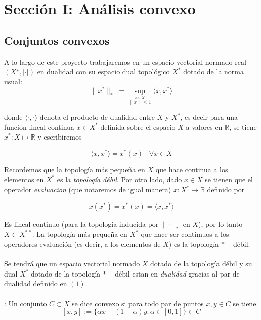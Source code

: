 \section{Secci\'on I: An\'alisis convexo}

\subsection{Conjuntos convexos \cite{pajardo}}

A lo largo de este proyecto trabajaremos en un espacio vectorial normado real $(X*, |\cdot|)$ en 
dualidad con su espacio dual topol\'ogico $X^*$ dotado de la norma usual:
    \[\parallel x^*  \parallel_* := \sup_{\overset{x \in X}{ \parallel x \parallel
                          \leqslant 1}} \langle x, x^* \rangle \] 
                          
donde $  \langle \cdot , \cdot \rangle$ denota el producto de dualidad entre $X$ y $X^*$, es decir para una 
funcion lineal continua $x \in X^*$ definida sobre el espacio $X$ a valores en $\mathbb{R}$, se tiene
$x^*: X \longmapsto \mathbb{R}$ y escribiremos 

\begin{equation}
   \langle x, x^* \rangle = x^{*}(x)\, \, \,\,\, \forall x \in X
\end{equation}

Recordemos que la topolog\'ia m\'as peque\~na en $X$ que hace continua a los elementos en $X^*$ es 
la {\it topolog\'ia d\'ebil}. Por otro lado, dado $x \in X$ se tienen que el operador {\it 
evaluacion} (que notaremos de igual manera) $x: X^{*} \longmapsto \mathbb{R}$ definido por

$$x(x^*)= x^*(x) = \langle x, x^* \rangle$$

Es lineal continuo (para la topolog\'ia inducida por $\parallel \cdot \parallel_{*}$ en $X$), por lo 
tanto $X\subset X^{**}$. La topolog\'ia m\'as peque\~na en $X^*$ que hace ser contimuos a los 
operadores evaluaci\'on (es decir, a los elementos de $X$) es la topolog\'ia $*-$d\'ebil.\\ \\

Se tendr\'a que un espacio vectorial normado $X$ dotado de la topolog\'ia d\'ebil y su dual $X^*$ 
dotado de la topolog\'ia $*-$d\'ebil estan en {\it dualidad} gracias al par de dualidad definido en 
$(1)$.\\ \\

{: Un conjunto $C \subset X$ se dice convexo si para todo par de puntos $x,y \in C$ se
tiene
$$[x,y] := \{\alpha x + (1-\alpha)y: \alpha \in [0,1]\} \subset C$$ \label{def1} }

